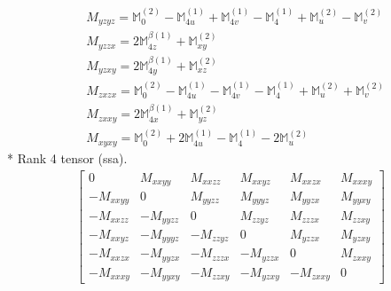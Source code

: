 \documentclass[fleqn,8pt,landscape]{jsarticle}
\begin{document}
\begin{align*}
& M_{yzyz} = \mathbb{M}_{0}^{(2)} - \mathbb{M}_{4u}^{(1)} + \mathbb{M}_{4v}^{(1)} - \mathbb{M}_{4}^{(1)} + \mathbb{M}_{u}^{(2)} - \mathbb{M}_{v}^{(2)} \\
& M_{yzzx} = 2 \mathbb{M}_{4z}^{\beta(1)} + \mathbb{M}_{xy}^{(2)} \\
& M_{yzxy} = 2 \mathbb{M}_{4y}^{\beta(1)} + \mathbb{M}_{xz}^{(2)} \\
& M_{zxzx} = \mathbb{M}_{0}^{(2)} - \mathbb{M}_{4u}^{(1)} - \mathbb{M}_{4v}^{(1)} - \mathbb{M}_{4}^{(1)} + \mathbb{M}_{u}^{(2)} + \mathbb{M}_{v}^{(2)} \\
& M_{zxxy} = 2 \mathbb{M}_{4x}^{\beta(1)} + \mathbb{M}_{yz}^{(2)} \\
& M_{xyxy} = \mathbb{M}_{0}^{(2)} + 2 \mathbb{M}_{4u}^{(1)} - \mathbb{M}_{4}^{(1)} - 2 \mathbb{M}_{u}^{(2)}
\end{align*}
* Rank 4 tensor (ssa).
\begin{align*}
\begin{bmatrix} 0 & M_{xxyy} & M_{xxzz} & M_{xxyz} & M_{xxzx} & M_{xxxy} \\ - M_{xxyy} & 0 & M_{yyzz} & M_{yyyz} & M_{yyzx} & M_{yyxy} \\ - M_{xxzz} & - M_{yyzz} & 0 & M_{zzyz} & M_{zzzx} & M_{zzxy} \\ - M_{xxyz} & - M_{yyyz} & - M_{zzyz} & 0 & M_{yzzx} & M_{yzxy} \\ - M_{xxzx} & - M_{yyzx} & - M_{zzzx} & - M_{yzzx} & 0 & M_{zxxy} \\ - M_{xxxy} & - M_{yyxy} & - M_{zzxy} & - M_{yzxy} & - M_{zxxy} & 0 \end{bmatrix}
\end{align*}
\end{document}
